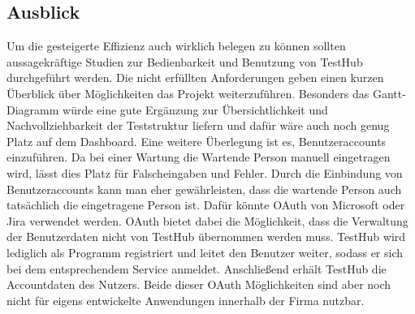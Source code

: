 \subsection{Ausblick}
Um die gesteigerte Effizienz auch wirklich belegen zu können sollten aussagekräftige
Studien zur Bedienbarkeit und Benutzung von TestHub durchgeführt werden.
Die nicht erfüllten Anforderungen geben einen kurzen Überblick über Möglichkeiten
das Projekt weiterzuführen. Besonders das Gantt-Diagramm würde eine gute Ergänzung
zur Übersichtlichkeit und Nachvollziehbarkeit der Teststruktur liefern und dafür
wäre auch noch genug Platz auf dem Dashboard.
Eine weitere Überlegung ist es, Benutzeraccounts einzuführen. Da bei einer Wartung
die Wartende Person manuell eingetragen wird, lässt dies Platz für Falscheingaben und Fehler. 
Durch die Einbindung von Benutzeraccounts kann man eher gewährleisten, dass die 
wartende Person auch tatsächlich die eingetragene Person ist. Dafür könnte OAuth
von Microsoft oder Jira verwendet werden. OAuth bietet dabei die Möglichkeit, dass
die Verwaltung der Benutzerdaten nicht von TestHub übernommen werden muss. TestHub
wird lediglich als Programm registriert und leitet den Benutzer weiter, sodass er sich
bei dem entsprechendem Service anmeldet. Anschließend erhält TestHub die Accountdaten
des Nutzers. Beide dieser OAuth Möglichkeiten sind aber noch nicht für eigens entwickelte 
Anwendungen innerhalb der Firma nutzbar.